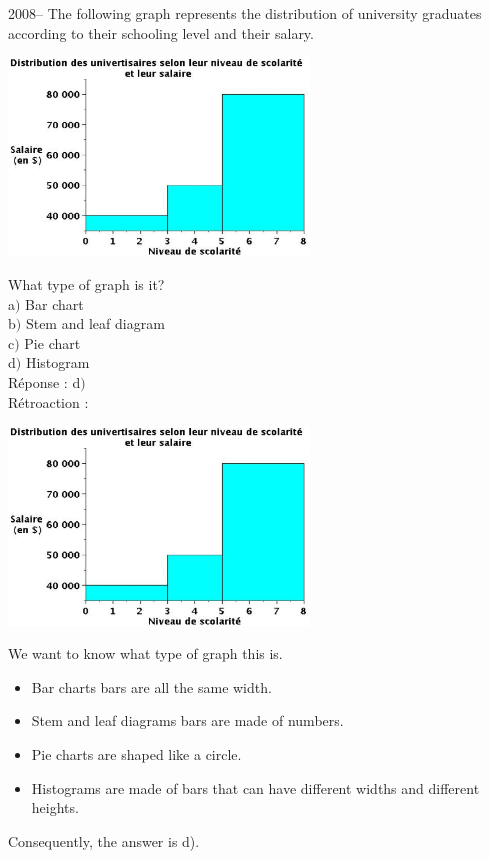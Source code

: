 \documentclass[letterpaper, 12pt]{article}
\begin{document}

2008-- The following graph represents the distribution of university graduates according to their schooling level and their salary.
\begin{center}
 \includegraphics[width=8cm,bb=14 14 611 415]{Q2008v.eps}
\end{center}

What type of graph is it?\\
a$)$ Bar chart\\
b$)$ Stem and leaf diagram\\
c$)$ Pie chart\\
d$)$ Histogram\\

R\'eponse : d$)$\\

R\'etroaction :
\begin{center}
 \includegraphics[width=8cm,bb=14 14 611 415]{Q2008v.eps}
\end{center}
We want to know what type of graph this is.\\
\begin{itemize}
 \item Bar charts bars are all the same width.\\
 \item Stem and leaf diagrams bars are made of numbers.\\
 \item Pie charts are shaped like a circle.\\
 \item Histograms are made of bars that can have different widths and different heights.\\
\end{itemize}
Consequently, the answer is d).\\
\end{document}
